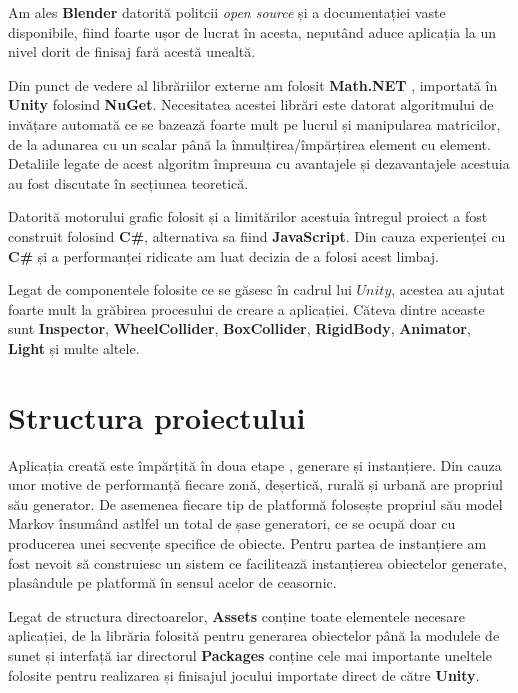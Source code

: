 Am ales \textbf{Blender} datorită politcii \textit{open source} și a documentației vaste disponibile, fiind foarte ușor de lucrat în acesta, neputând aduce aplicația la un nivel dorit de finisaj fară acestă unealtă.\par

Din punct de vedere al librăriilor externe am folosit \textbf{Math.NET} , importată în \textbf{Unity} folosind \textbf{NuGet}. Necesitatea acestei librări este datorat algoritmului de invățare automată ce se bazează foarte mult pe lucrul și manipularea matricilor, de la adunarea cu un scalar până la înmulțirea/împărțirea element cu element. Detaliile legate de acest algoritm împreuna cu avantajele și dezavantajele acestuia au fost discutate în secțiunea teoretică.\par

Datorită motorului grafic folosit și a limitărilor acestuia întregul proiect a fost construit folosind \textbf{C\#}, alternativa sa fiind \textbf{JavaScript}. Din cauza experienței cu \textbf{C\#} și a performanței ridicate am luat decizia de a folosi acest limbaj.\par

Legat de componentele folosite ce se găsesc în cadrul lui $Unity$, acestea au ajutat foarte mult la grăbirea procesului de creare a aplicației. Căteva dintre aceaste sunt \textbf{Inspector}, \textbf{WheelCollider}, \textbf{BoxCollider}, \textbf{RigidBody}, \textbf{Animator}, \textbf{Light} și multe altele.\par

\section{Structura proiectului}

Aplicația creată este împărțită în doua etape , generare și instanțiere. Din cauza unor motive de performanță fiecare zonă, deșertică, rurală și urbană are propriul său generator. De asemenea fiecare tip de platformă folosește propriul său model Markov însumând astlfel un total de șase generatori, ce se ocupă doar cu producerea unei secvențe specifice de obiecte. Pentru partea de instanțiere am fost nevoit să construiesc un sistem ce facilitează instanțierea obiectelor generate, plasândule pe platformă în sensul acelor de ceasornic.\par

Legat de structura directoarelor, \textbf{Assets} conține toate elementele necesare aplicației, de la librăria folosită pentru generarea obiectelor până la modulele de sunet și interfață iar directorul \textbf{Packages} conține cele mai importante uneltele folosite pentru realizarea și finisajul jocului importate direct de către \textbf{Unity}.\par

